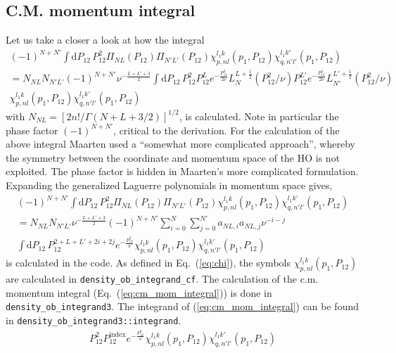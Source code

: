 \documentclass[10pt]{article}
\begin{document}
\subsection{C.M. momentum integral}
\label{ssec:cm_mom_integral}
Let us take a closer a look at how the integral
\begin{multline}
(-1)^{N+N'}\int \text{d} P_{12} \, P_{12}^{2} \Pi_{N L}(P_{12}) \Pi_{N' 
L'}(P_{12}) \chi_{p,nl}^{l_1 k}(p_1,P_{12}) \chi_{q,n'l'}^{l_1 
k'}(p_1,P_{12}) \\
= N_{NL} N_{N'L'} (-1)^{N+N'} \nu^{ - \frac{L+L'+3}{2}} \int \text{d} P_{12} \, 
P_{12}^{2} 
P_{12}^{L} e^{- \frac{P_{12}^{2}}{2 \nu}} L_{N}^{L+\frac{1}{2}}( 
P_{12}^{2}/\nu) 
P_{12}^{L'} e^{- \frac{P_{12}^{2}}{2 \nu}} L_{N'}^{L'+\frac{1}{2}}( 
P_{12}^{2}/\nu)  \\
\chi_{p,nl}^{l_1 k}(p_1,P_{12}) \chi_{q,n'l'}^{l_1 k'}(p_1,P_{12}) \,
\end{multline}
with $N_{NL} = [ 2n! / \Gamma( N + L + 3/2) ]^{1/2}$, is calculated.
Note in particular the phase factor $(-1)^{N+N'}$, critical to the derivation.
For the calculation of the above integral Maarten used a ``somewhat more 
complicated approach'', whereby the symmetry between the coordinate and 
momentum space of the HO is not exploited.
The phase factor is hidden in Maarten's more complicated formulation.
Expanding the generalized Laguerre polynomials in momentum space gives,
\begin{multline}
(-1)^{N+N'} \int \text{d} P_{12} \, P_{12}^{2} \Pi_{N L}(P_{12}) \Pi_{N' 
L'}(P_{12}) \chi_{p,nl}^{l_1 k}(p_1,P_{12}) \chi_{q,n'l'}^{l_1 
k'}(p_1,P_{12}) \\
= N_{NL} N_{N'L'} \nu^{ - \frac{L+L'+3}{2}} (-1)^{N+N'}
\sum_{i=0}^{N} \sum_{j=0}^{N'} a_{NL,i} a_{NL,j} \nu^{-i-j} \\
 \int \text{d} P_{12} \, P_{12}^{2+L+L'+2i+2j}  e^{- \frac{P_{12}^{2}}{ \nu}}  
\chi_{p,nl}^{l_1 k}(p_1,P_{12}) \chi_{q,n'l'}^{l_1 k'}(p_1,P_{12})
\label{eq:cm_mom_integral}
\end{multline}
is calculated in the code. As defined in Eq.~(\ref{eq:chi}), the symbols 
$\chi_{p,nl}^{l_1 k}(p_1,P_{12})$ are calculated in 
\texttt{density\_ob\_integrand\_cf}. The calculation of the c.m. momentum 
integral (Eq.~(\ref{eq:cm_mom_integral})) is done in 
\texttt{density\_ob\_integrand3}. The integrand of (\ref{eq:cm_mom_integral}) 
can be found in \texttt{density\_ob\_integrand3::integrand}.
\begin{align*}
	P_{12}^{2} P_{12}^{\text{index}} e^{-\frac{P_{12}^{2}}{\nu}}  
\chi_{p,nl}^{l_1 k}(p_1,P_{12}) \chi_{q,n'l'}^{l_1 k'}(p_1,P_{12}) 
\end{align*}
\end{document}
